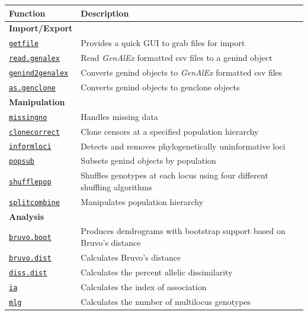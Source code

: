 \documentclass[letterpaper]{article}\usepackage[]{graphicx}\usepackage[]{color}
\begin{document}
\begin{table}[ht]
\centering
\begin{tabular}{ll}
\textbf{\large Function} & \textbf{\large Description} \\ 
\hline
\textbf{Import/Export} & \\
\texttt{\hyperref[intro:import:getfile]{getfile}} & Provides a quick GUI to grab files for import \\
\texttt{\hyperref[intro:import:read.genalex]{read.genalex}} & Read \textit{GenAlEx} formatted csv files to a genind object \\
\texttt{\hyperref[intro:import:genind2genalex]{genind2genalex}} & Converts genind objects to \textit{GenAlEx} formatted csv files \\
\texttt{\hyperref[intro:genclone:as.genclone]{as.genclone}} & Converts genind objects to genclone objects \\
\hline
\textbf{Manipulation} & \\
\texttt{\hyperref[data.manip:missing:missingno]{missingno}} & Handles missing data \\
\texttt{\hyperref[data.manip:cc:clonecorrect]{clonecorrect}} & Clone censors at a specified population hierarchy \\
\texttt{\hyperref[data.manip:informloci]{informloci}} & Detects and removes phylogenetically uninformative loci \\
\texttt{\hyperref[data.manip:divide:popsub]{popsub}} & Subsets genind objects by population \\
\texttt{\hyperref[data.manip:shuffle:shufflepop]{shufflepop}} & Shuffles genotypes at each locus using four different shuffling algorithms \\
\texttt{\hyperref[data.manip:hier:splitcombine]{splitcombine}} & Manipulates population hierarchy \\ 
\hline
\textbf{Analysis} & \\
\texttt{\hyperref[index:trees:bruvo.boot]{bruvo.boot}} & Produces dendrograms with bootstrap support based on Bruvo's distance \\
\texttt{\hyperref[index:bruvo:bruvo.dist]{bruvo.dist}} & Calculates Bruvo's distance \\
\texttt{\hyperref[index:dist:diss.dist]{diss.dist}} & Calculates the percent allelic dissimilarity \\
\texttt{\hyperref[index:iard:ia]{ia}} & Calculates the index of association \\
\texttt{\hyperref[mlg:mlg:mlg]{mlg}} & Calculates the number of multilocus genotypes \\

\end{tabular}
\end{table}
\end{document}

